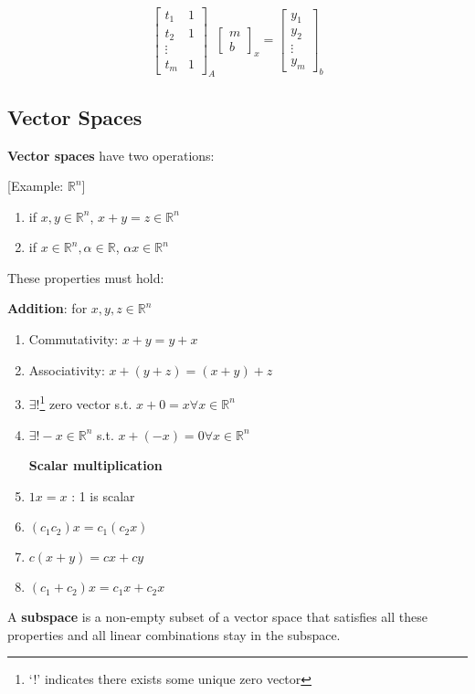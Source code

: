 \documentclass[12pt]{article}
\newcommand{\bbR}{\mathds{R}}
\newcommand{\<}{\langle}
\renewcommand{\>}{\rangle}
\begin{document}
\[
	\begin{bmatrix}
		t_1 & 1\\
		t_2 & 1\\
		\vdots \\
		t_m & 1
	\end{bmatrix}_A
	\begin{bmatrix}
		m \\ b
	\end{bmatrix}_x =
	\begin{bmatrix}
		y_1 \\ y_2 \\ \vdots \\ y_m
	\end{bmatrix}_b
\]

\subsection{Vector Spaces}
\textbf{Vector spaces} have two operations:

[Example: $\bbR^n$]

\begin{enumerate}
	\item if $x,y \in \bbR^n$, $x+ y = z \in \bbR^n$
	\item if $x \in \bbR^n, \alpha \in \bbR$, $\alpha x \in \bbR^n$
\end{enumerate}

These properties must hold:

\textbf{Addition}: for $x, y, z \in \bbR^n$
\begin{enumerate}
	\item Commutativity: $x + y = y + x$
	\item Associativity: $x + (y + z) = (x + y) + z$
	\item $\exists!$\footnote{`!' indicates there exists some unique zero vector} zero vector s.t. $x + 0 = x \forall x \in \bbR^n$
	\item $\exists! -x \in \bbR^n$ s.t. $x + (-x) = 0 \forall x \in \bbR^n$

	\textbf{Scalar multiplication}

	\item $1 x = x$ : 1 is scalar
	\item $(c_1 c_2) x = c_1(c_2x)$
	\item $c(x+y) = cx + cy$
	\item $(c_1 + c_2)x = c_1 x + c_2 x$
\end{enumerate}

A \textbf{subspace} is a non-empty subset of a vector space that satisfies all these properties and all linear combinations stay in the subspace.
\end{document}
